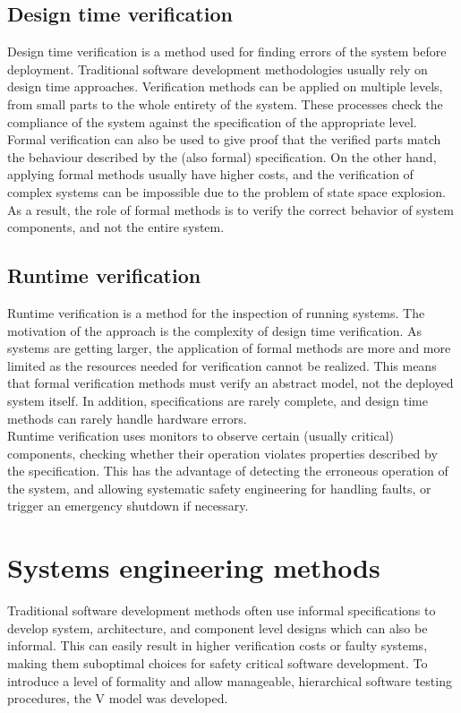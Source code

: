 \subsection{Design time verification}

Design time verification is a method used for finding errors of the system before deployment. Traditional software development methodologies usually rely on design time approaches. Verification methods can be applied on multiple levels, from small parts to the whole entirety of the system. These processes check the compliance of the system against the specification of the appropriate level.\\
Formal verification can also be used to give proof that the verified parts match the behaviour described by the (also formal) specification. On the other hand, applying formal methods usually have higher costs, and the verification of complex systems can be impossible due to the problem of state space explosion. As a result, the role of formal methods is to verify the correct behavior of system components, and not the entire system.

\subsection{Runtime verification}

Runtime verification is a method for the inspection of running systems. The motivation of the approach is the complexity of design time verification. As systems are getting larger, the application of formal methods are more and more limited as the resources needed for verification cannot be realized. This means that formal verification methods must verify an abstract model, not the deployed system itself. In addition, specifications are rarely complete, and design time methods can rarely handle hardware errors.\\
Runtime verification uses monitors to observe certain (usually critical) components, checking whether their operation violates properties described by the specification. This has the advantage of detecting the erroneous operation of the system, and allowing systematic safety engineering for handling faults, or trigger an emergency shutdown if necessary.

\section{Systems engineering methods}

Traditional software development methods often use informal specifications to develop system, architecture, and component level designs which can also be informal. This can easily result in higher verification costs or faulty systems, making them suboptimal choices for safety critical software development. To introduce a level of formality and allow manageable, hierarchical software testing procedures, the V model was developed.

